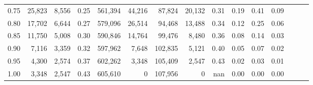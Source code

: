 \begin{tabular}{rrrrrrrrrrrrrrr}
0.75 &  25,823 &  8,556 &  0.25 &  561,394 &   44,216 &   87,824 &   20,132 &  0.31 &  0.19 &  0.41 &      0.09 \\
0.80 &  17,702 &  6,644 &  0.27 &  579,096 &   26,514 &   94,468 &   13,488 &  0.34 &  0.12 &  0.25 &      0.06 \\
0.85 &  11,750 &  5,008 &  0.30 &  590,846 &   14,764 &   99,476 &    8,480 &  0.36 &  0.08 &  0.14 &      0.03 \\
0.90 &   7,116 &  3,359 &  0.32 &  597,962 &    7,648 &  102,835 &    5,121 &  0.40 &  0.05 &  0.07 &      0.02 \\
0.95 &   4,300 &  2,574 &  0.37 &  602,262 &    3,348 &  105,409 &    2,547 &  0.43 &  0.02 &  0.03 &      0.01 \\
1.00 &   3,348 &  2,547 &  0.43 &  605,610 &        0 &  107,956 &        0 &   nan &  0.00 &  0.00 &      0.00 \\
\bottomrule
\end{tabular}
